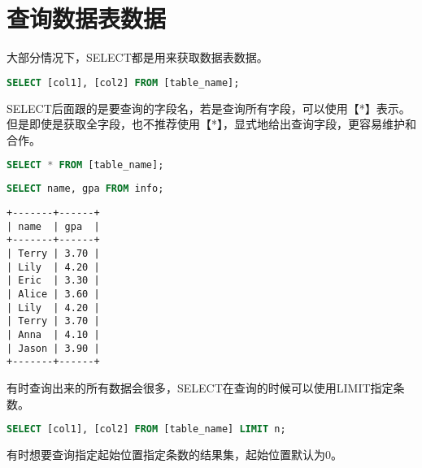 \documentclass[12pt, openany, oneside]{book}
\begin{document}
\vspace{0.5cm}

\section{查询数据表数据}

大部分情况下，SELECT都是用来获取数据表数据。

\vspace{-0.5cm}

\begin{lstlisting}[language=SQL]
SELECT [col1], [col2] FROM [table_name];
\end{lstlisting}

SELECT后面跟的是要查询的字段名，若是查询所有字段，可以使用【*】表示。但是即使是获取全字段，也不推荐使用【*】，显式地给出查询字段，更容易维护和合作。

\vspace{-0.5cm}

\begin{lstlisting}[language=SQL]
SELECT * FROM [table_name];
\end{lstlisting}

\vspace{0.5cm}


\begin{lstlisting}[language=SQL]
SELECT name, gpa FROM info;
\end{lstlisting}

\begin{tcolorbox}
	\begin{verbatim}
+-------+------+
| name  | gpa  |
+-------+------+
| Terry | 3.70 |
| Lily  | 4.20 |
| Eric  | 3.30 |
| Alice | 3.60 |
| Lily  | 4.20 |
| Terry | 3.70 |
| Anna  | 4.10 |
| Jason | 3.90 |
+-------+------+
\end{verbatim}
\end{tcolorbox}

有时查询出来的所有数据会很多，SELECT在查询的时候可以使用LIMIT指定条数。

\vspace{-0.5cm}

\begin{lstlisting}[language=SQL]
SELECT [col1], [col2] FROM [table_name] LIMIT n;
\end{lstlisting}

有时想要查询指定起始位置指定条数的结果集，起始位置默认为0。

\vspace{-0.5cm}
\end{document}
